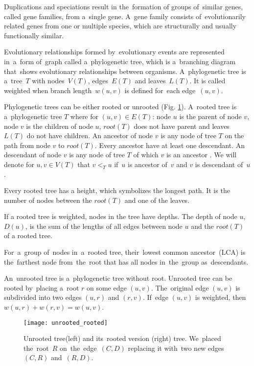 Duplications and speciations result in the~formation of groups of~similar genes, called gene families, from a~single gene. A~gene family consists of~evolutionarily related genes from one or multiple species, which are structurally and usually functionally similar.

Evolutionary relationships formed by~evolutionary events are represented in~a~form of~graph called a~phylogenetic tree, which is a~branching diagram that~shows evolutionary relationships between organisms. A~phylogenetic tree is a~tree~$T$ with nodes~$V(T)$, edges~$E(T)$ and leaves~$L(T)$. It is called weighted when branch length~$w(u, v)$ is defined for~each edge~$(u, v)$.

Phylogenetic trees can be either rooted or unrooted (Fig. \ref{unrooted_rooted}). A~rooted tree is a~phylogenetic tree $T$ where for $(u, v) \in E(T)$: node $u$ is the parent of node $v$, node $v$ is the children of node $u$, $root(T)$ does not have parent and leaves $L(T)$ do not have children. An ancestor of node $v$ is any node of tree $T$ on the path from node $v$ to $root(T)$. Every ancestor have at least one descendant. An descendant of node $v$ is any node of tree $T$ of which $v$ is an ancestor \cite{hasic}. We will denote for $u, v \in V(T)$ that $v<_Tu$ if~$u$ is ancestor of~$v$ and $v$ is descendant of~$u$.

Every rooted tree has a height, which symbolizes the longest path. It is the number of nodes between the $root(T)$ and one of the leaves. 

If a rooted tree is weighted, nodes in the tree have depths. The depth of node $u$, $D(u)$, is the sum of the lengths of all edges between node $u$ and the $root(T)$ of a rooted tree.

For~a~group of~nodes in~a~rooted tree, their~lowest common ancestor~(LCA) is the~farthest node from~the~root that has all nodes in~the~group as~descendants.

An~unrooted tree is a~phylogenetic tree without root. Unrooted tree can be rooted by~placing a~root $r$ on some edge $(u, v)$. The~original edge $(u, v)$ is subdivided into two edges $(u, r)$ and $(r, v)$. If~edge $(u, v)$ is weighted, then $w(u, r) + w(r, v) = w(u, v)$.

\begin{figure}[ht]
	\centering
	\label{unrooted_rooted}
  	\texttt{[image: unrooted\_rooted]}
  	\caption{Unrooted tree(left) and its~rooted version (right) tree. We~placed the~root~$R$ on~the~edge~$(C, D)$ replacing it with~two new edges~$(C, R)$ and~$(R, D)$.}
\end{figure}

